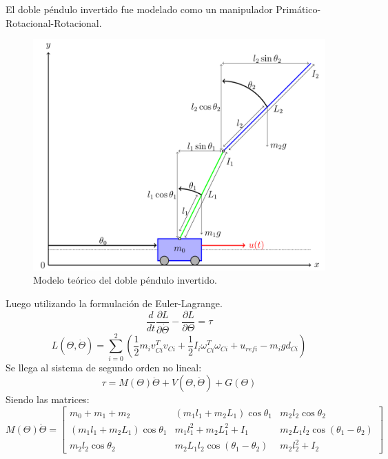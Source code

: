 %
%

El doble péndulo invertido fue modelado como un manipulador Primático-Rotacional-Rotacional. 
\begin{figure}[H]
	\centering
	\includegraphics[width=\linewidth]{../Modelo Teorico/ImagenesModelo Teorico/sistema}
	\caption{Modelo teórico del doble péndulo invertido.}	
	\label{fig:pendteo}
\end{figure}
Luego utilizando la formulación de Euler-Lagrange.
\begin{equation}
  \frac{d}{dt}\frac{\partial L}{\partial \dot{\Theta}} - \frac{\partial L}{\partial \Theta}  = \tau
\end{equation} 
\begin{equation}
L\left( \Theta , \dot{\Theta} \right) = \sum_{i=0}^2
\left( \frac{1}{2} m_i v_{Ci}^Tv_{Ci} +\frac{1}{2} I_i \omega_{Ci}^T\omega_{Ci} + u_{refi} - m_i g d_{Ci}\right)
\end{equation} 
Se llega al sistema de segundo orden no lineal:
\begin{equation}
\tau = M\left( \Theta \right)\ddot{\Theta} + V\left( \Theta , \dot{\Theta} \right) + G\left( \Theta \right)
\end{equation}
Siendo las matrices:
\begin{equation}
 M\left( \Theta \right)\ddot{\Theta} = \begin{bmatrix}
m_0+m_1+m_2 & \left( m_1l_1 + m_2L_1 \right) \cos \theta_1 & m_2l_2 \cos \theta_2\\

\left( m_1l_1 + m_2L_1 \right) \cos \theta_1  &
m_1l_1^2+m_2L_1^2+I_1
& m_2L_1l_2\cos(\theta_1-\theta_2)\\


m_2l_2\cos\theta_2 & m_2L_1l_2\cos(\theta_1-\theta_2) & m_2l_2^2+I_2
\end{bmatrix}
\end{equation}
